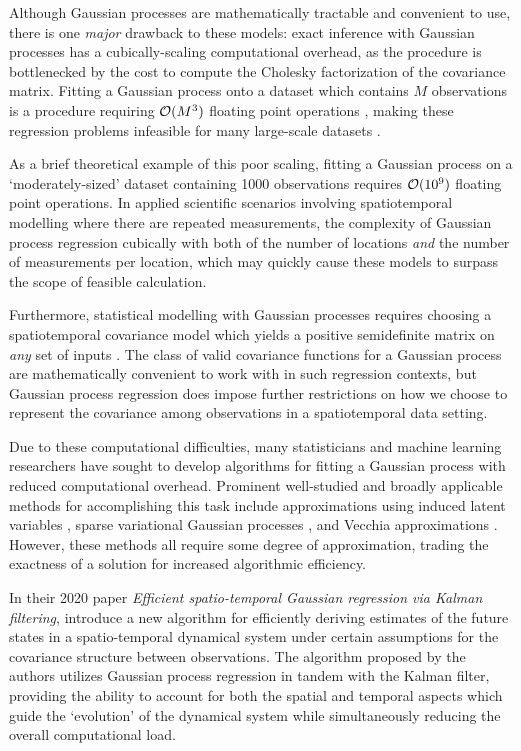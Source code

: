 \documentclass[10pt]{article}
\numberwithin{equation}{section}
\begin{document}
Although Gaussian processes are mathematically tractable and convenient to use, there is one \emph{major} drawback to these models: exact inference with Gaussian processes has a cubically-scaling computational overhead, as the procedure is bottlenecked by the cost to compute the Cholesky factorization of the covariance matrix. Fitting a Gaussian process onto a dataset which contains $M$ observations is a procedure requiring $\mathcal{O}(M^{3})$ floating point operations \citep{GPML-Book-2006}, making these regression problems infeasible for many large-scale datasets \citep{Guhaniyogi-Meta-Kriging-2018,Pfoertner-Comp-Aware-2025,Salari-GP-Turbines-2025}.

As a brief theoretical example of this poor scaling, fitting a Gaussian process on a `moderately-sized' dataset containing 1000 observations requires $\mathcal{O}(10^{9})$ floating point operations. In applied scientific scenarios involving spatiotemporal modelling where there are repeated measurements, the complexity of Gaussian process regression cubically with both of the number of locations \emph{and} the number of measurements per location, which may quickly cause these models to surpass the scope of feasible calculation.

Furthermore, statistical modelling with Gaussian processes requires choosing a spatiotemporal covariance model which yields a positive semidefinite matrix on \emph{any} set of inputs \citep{GPML-Book-2006}. The class of valid covariance functions for a Gaussian process are mathematically convenient to work with in such regression contexts, but Gaussian process regression does impose further restrictions on how we choose to represent the covariance among observations in a spatiotemporal data setting. 

Due to these computational difficulties, many statisticians and machine learning researchers have sought to develop algorithms for fitting a Gaussian process with reduced computational overhead. Prominent well-studied and broadly applicable methods for accomplishing this task include approximations using induced latent variables \citep{Quinonero-Sparse-GP-2005}, sparse variational Gaussian processes \citep{Titsias-SVGP-2009}, and Vecchia approximations \citep{Katzfuss-Vecchia-2021}. However, these methods all require some degree of approximation, trading the exactness of a solution for increased algorithmic efficiency. 

In their 2020 paper \emph{Efficient spatio-temporal Gaussian regression via Kalman filtering}, \citeauthor{Todescato-Efficient-2020} introduce a new algorithm for efficiently deriving estimates of the future states in a spatio-temporal dynamical system under certain assumptions for the covariance structure between observations. The algorithm proposed by the authors utilizes Gaussian process regression in tandem with the Kalman filter, providing the ability to account for both the spatial and temporal aspects which guide the `evolution' of the dynamical system while simultaneously reducing the overall computational load. 
\end{document}
